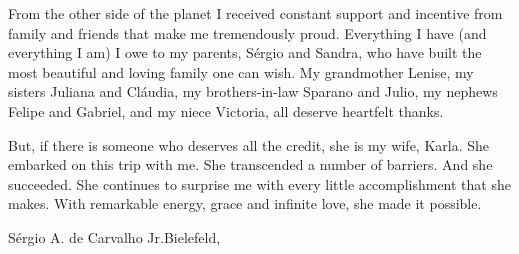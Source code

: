 From the other side of the planet I received constant support and incentive from
family and friends that make me tremendously proud. Everything I have (and
everything I am) I owe to my parents, S\'ergio and Sandra, who have built the
most beautiful and loving family one can wish. My grandmother Lenise, my sisters
Juliana and Cl\'audia, my brothers-in-law Sparano and Julio, my nephews Felipe
and Gabriel, and my niece Victoria, all deserve heartfelt thanks.

But, if there is someone who deserves all the credit, she is my wife, Karla. She
embarked on this trip with me. She transcended a number of barriers. And she
succeeded. She continues to surprise me with every little accomplishment that
she makes. With remarkable energy, grace and infinite love, she made it
possible.

\vspace*{6ex}
S\'ergio A. de Carvalho Jr.\hfill Bielefeld, \finalmonth
